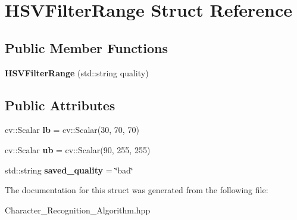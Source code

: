 \hypertarget{struct_h_s_v_filter_range}{}\section{H\+S\+V\+Filter\+Range Struct Reference}
\label{struct_h_s_v_filter_range}
\subsection*{Public Member Functions}
\begin{DoxyCompactItemize}
\item 
\mbox{\label{struct_h_s_v_filter_range_a4e37551e92211618e217752f0056847a}} 
{\bfseries H\+S\+V\+Filter\+Range} (std\+::string quality)
\end{DoxyCompactItemize}
\subsection*{Public Attributes}
\begin{DoxyCompactItemize}
\item 
\mbox{\label{struct_h_s_v_filter_range_a0c5c2a10fb591c4dd1512ae81e1032a4}} 
cv\+::\+Scalar {\bfseries lb} = cv\+::\+Scalar(30, 70, 70)
\item 
\mbox{\label{struct_h_s_v_filter_range_a1c5b705f9992e014fd4dd7085e078c9d}} 
cv\+::\+Scalar {\bfseries ub} = cv\+::\+Scalar(90, 255, 255)
\item 
\mbox{\label{struct_h_s_v_filter_range_a5ded3fde3f4b37d5e0de6f40fd508271}} 
std\+::string {\bfseries saved\+\_\+quality} = \char`\"{}bad\char`\"{}
\end{DoxyCompactItemize}


The documentation for this struct was generated from the following file\+:\begin{DoxyCompactItemize}
\item 
Character\+\_\+\+Recognition\+\_\+\+Algorithm.\+hpp\end{DoxyCompactItemize}
